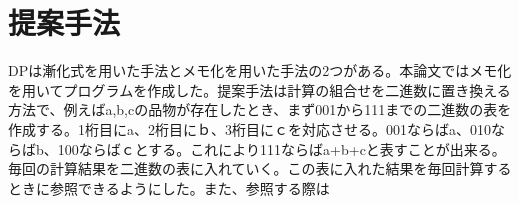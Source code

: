 \chapter{提案手法}
\label{cha:xxx}
DPは漸化式を用いた手法とメモ化を用いた手法の2つがある。本論文ではメモ化を用いてプログラムを作成した。提案手法は計算の組合せを二進数に置き換える方法で、例えばa,b,cの品物が存在したとき、まず001から111までの二進数の表を作成する。1桁目にa、2桁目にｂ、3桁目にｃを対応させる。001ならばa、010ならばb、100ならばｃとする。これにより111ならばa+b+cと表すことが出来る。毎回の計算結果を二進数の表に入れていく。この表に入れた結果を毎回計算するときに参照できるようにした。また、参照する際は

